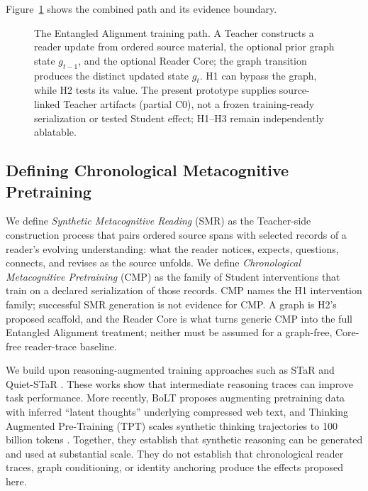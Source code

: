 \documentclass[11pt]{article}
\begin{document}
Figure~\ref{fig:training-path} shows the combined path and its evidence boundary.

\begin{figure}[ht]
    \centering
    \resizebox{\textwidth}{!}{}
    \caption{The Entangled Alignment training path. A Teacher constructs a reader update from ordered source material, the optional prior graph state $g_{t-1}$, and the optional Reader Core; the graph transition produces the distinct updated state $g_t$. H1 can bypass the graph, while H2 tests its value. The present prototype supplies source-linked Teacher artifacts (partial C0), not a frozen training-ready serialization or tested Student effect; H1--H3 remain independently ablatable.}
    \label{fig:training-path}
\end{figure}

\subsection{Defining Chronological Metacognitive Pretraining}\label{sec:cmp-definition}

We define \emph{Synthetic Metacognitive Reading} (SMR) as the Teacher-side
construction process that pairs ordered source spans with selected records of a
reader's evolving understanding: what the reader notices, expects, questions,
connects, and revises as the source unfolds. We define \emph{Chronological
Metacognitive Pretraining} (CMP) as the family of Student interventions that
train on a declared serialization of those records. CMP names the H1
intervention family; successful SMR generation is not evidence for CMP. A graph
is H2's proposed scaffold, and the Reader Core is what turns generic CMP into the
full Entangled Alignment treatment; neither must be assumed for a graph-free,
Core-free reader-trace baseline.

We build upon reasoning-augmented training approaches such as STaR \cite{zelikman2022star} and Quiet-STaR \cite{zelikman2024quietstar}. These works show that intermediate reasoning traces can improve task performance. More recently, BoLT \cite{ruan2025bolt} proposes augmenting pretraining data with inferred ``latent thoughts'' underlying compressed web text, and Thinking Augmented Pre-Training (TPT) scales synthetic thinking trajectories to 100 billion tokens \cite{nvidia2025tpt}. Together, they establish that synthetic reasoning can be generated and used at substantial scale. They do not establish that chronological reader traces, graph conditioning, or identity anchoring produce the effects proposed here.
\end{document}
